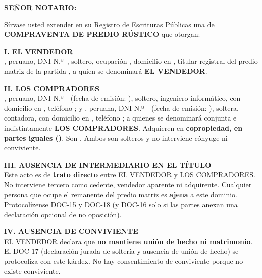 \documentclass[12pt,a4paper]{article}
\begin{document}


\noindent \textbf{SEÑOR NOTARIO:}

\vspace{0.2em}
\noindent Sírvase usted extender en su Registro de Escrituras Públicas una de \textbf{COMPRAVENTA DE PREDIO RÚSTICO} que otorgan:

\vspace{0.25em}
\noindent \textbf{I. EL VENDEDOR}\\
\VendedorNombreCompleto, peruano, DNI N.º\ \VendedorDNI, soltero, ocupación \VendedorOcupacion, domicilio en \VendedorDomicilio, titular registral del predio matriz de la partida \PartidaMatriz, a quien se denominará \textbf{EL VENDEDOR}.

\vspace{0.2em}
\noindent \textbf{II. LOS COMPRADORES}\\
\textbf{\CompradorUnoNombre}, peruano, DNI N.º\ \CompradorUnoDNI\ (fecha de emisión: \CompradorUnoEmision), soltero, ingeniero informático, con domicilio en \CompradorUnoDomicilio, teléfono \CompradorUnoTelefono; y \textbf{\CompradorDosNombre}, peruana, DNI N.º\ \CompradorDosDNI\ (fecha de emisión: \CompradorDosEmision), soltera, contadora, con domicilio en \CompradorDosDomicilio, teléfono \CompradorDosTelefono; a quienes se denominará conjunta e indistintamente \textbf{LOS COMPRADORES}. Adquieren en \textbf{copropiedad, en partes iguales (\PorcentajeCopropiedad)}. Son \textbf{\CompradorParentesco}. Ambos son solteros y no interviene cónyuge ni conviviente.

\vspace{0.2em}
\noindent \textbf{III. AUSENCIA DE INTERMEDIARIO EN EL TÍTULO}\\
Este acto es de \textbf{trato directo} entre EL VENDEDOR y LOS COMPRADORES. No interviene tercero como cedente, vendedor aparente ni adquirente. Cualquier persona que ocupe el remanente del predio matriz es \textbf{ajena} a este dominio. Protocolízense DOC-15 y DOC-18 (y DOC-16 solo si las partes anexan una declaración opcional de no oposición).

\vspace{0.15em}
\noindent \textbf{IV. AUSENCIA DE CONVIVIENTE}\\
EL VENDEDOR declara que \textbf{no mantiene unión de hecho ni matrimonio}. El DOC-17 (declaración jurada de soltería y ausencia de unión de hecho) se protocoliza con este kárdex. No hay consentimiento de conviviente porque no existe conviviente.
\end{document}
